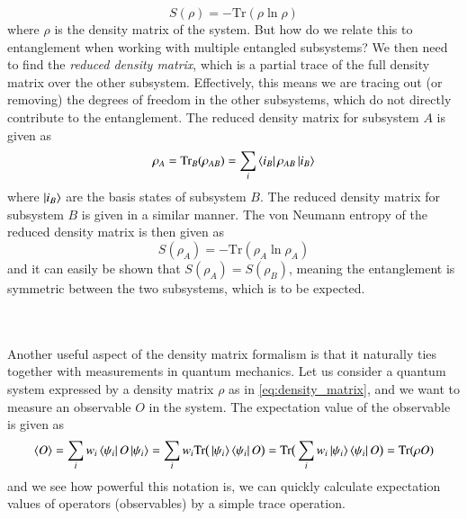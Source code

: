 \documentclass{subfiles}
\begin{document}
\begin{equation}
    S(\rho) = -\text{Tr}(\rho \ln \rho)
\end{equation}
where $\rho$ is the density matrix of the system. But how do we relate this to entanglement when working with multiple entangled subsystems? We then need to find the \emph{reduced density matrix}, which is a partial trace of the full density matrix over the other subsystem. Effectively, this means we are tracing out (or removing) the degrees of freedom in the other subsystems, which do not directly contribute to the entanglement. The reduced density matrix for subsystem $A$ is given as
\begin{equation}
    \rho_A = \text{Tr}_B(\rho_{AB}) = \sum_{i}\bra{i_B}\rho_{AB}\ket{i_B}
\end{equation}
where $\ket{i_B}$ are the basis states of subsystem $B$. The reduced density matrix for subsystem $B$ is given in a similar manner. The von Neumann entropy of the reduced density matrix is then given as
\begin{equation}
    S(\rho_A) = -\text{Tr}(\rho_A \ln \rho_A)
\end{equation}
and it can easily be shown that $S(\rho_A) = S(\rho_B)$, meaning the entanglement is symmetric between the two subsystems, which is to be expected. 


\\\\ 
Another useful aspect of the density matrix formalism is that it naturally ties together with measurements in quantum mechanics. Let us consider a quantum system expressed by a density matrix $\rho$ as in \eqref{eq:density_matrix}, and we want to measure an observable $O$ in the system. The expectation value of the observable is given as
\begin{align*}
    \braket{O} = \sum_i w_i\bra{\psi_i}O\ket{\psi_i} = \sum_i w_i\text{Tr}\big(\ket{\psi_i}\bra{\psi_i}O\big) = \text{Tr}\big(\sum_i w_i \ket{\psi_i}\bra{\psi_i}O\big) = \text{Tr}(\rho O)
\end{align*}
and we see how powerful this notation is, we can quickly calculate expectation values of operators (observables) by a simple trace operation. 
\end{document}
